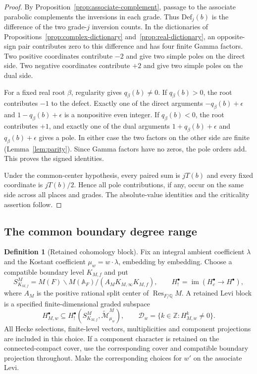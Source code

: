 \documentclass[12pt]{amsart}
\numberwithin{equation}{section}
\theoremstyle{plain}
\theoremstyle{definition}
\newtheorem{definition}[theorem]{Definition}
\theoremstyle{remark}
\newcommand{\Q}{\mathbb Q}
\newcommand{\Z}{\mathbb{Z}}
\newcommand{\tcM}{\widetilde{\mathcal M}}
\newcommand{\Def}{\mathrm{Def}}
\begin{document}
\begin{proof}
By Proposition~\ref{prop:associate-complement}, passage to the associate parabolic complements the inversions in each grade. Thus \(\Def_j(b)\) is the difference of the two grade-\(j\) inversion counts. In the dictionaries of Propositions~\ref{prop:complex-dictionary} and~\ref{prop:real-dictionary}, an opposite-sign pair contributes zero to this difference and has four finite Gamma factors. Two positive coordinates contribute \(-2\) and give two simple poles on the direct side. Two negative coordinates contribute \(+2\) and give two simple poles on the dual side.

For a fixed real root \(\beta\), regularity gives \(q_\beta(b)\ne0\). If \(q_\beta(b)>0\), the root contributes \(-1\) to the defect. Exactly one of the direct arguments \(-q_\beta(b)+\epsilon\) and \(1-q_\beta(b)+\epsilon\) is a nonpositive even integer. If \(q_\beta(b)<0\), the root contributes \(+1\), and exactly one of the dual arguments \(1+q_\beta(b)+\epsilon\) and \(q_\beta(b)+\epsilon\) gives a pole. In either case the two factors on the other side are finite (Lemma~\ref{lem:parity}). Since Gamma factors have no zeros, the pole orders add. This proves the signed identities.

Under the common-center hypothesis, every paired sum is \(jT(b)\) and every fixed coordinate is \(jT(b)/2\). Hence all pole contributions, if any, occur on the same side across all places and grades. The absolute-value identities and the criticality assertion follow.
\end{proof}

\subsection{The common boundary degree range}

\begin{definition}[Retained cohomology block] \label{def:retained-Levi-block}
Fix an integral ambient coefficient $\lambda$ and the Kostant coefficient $\mu_w=w\cdot\lambda$, embedding by embedding. Choose a compatible boundary level $K_{M,f}$ and put 
\[
 S^M_{K_{M,f}}=M(F)\backslash M(\mathbb A_F)/
 (A_MK_{M,\infty}K_{M,f}),\qquad
 H_!^\bullet=\operatorname{im}(H_c^\bullet\longrightarrow H^\bullet),
\]
where $A_M$ is the positive rational split center of $\operatorname{Res}_{F/\Q}M$. A retained Levi block is a specified finite-dimensional graded subspace 
\[
 H_{M,w}^\bullet\subseteq
 H_!^\bullet(S^M_{K_{M,f}},\tcM_{\mu_w}^M),\qquad
 \mathcal D_w=\{k\in\Z:H_{M,w}^k\ne0\}.
\]
All Hecke selections, finite-level vectors, multiplicities and component projections are included in this choice. If a component character is retained on the connected-compact cover, use the corresponding cover and compatible boundary projection throughout. Make the corresponding choices for $w'$ on the associate Levi.
\end{definition}
\end{document}
